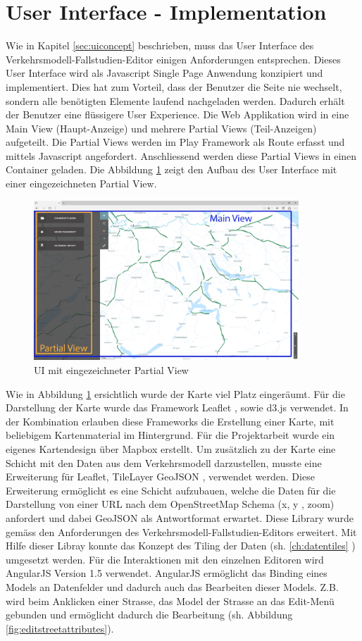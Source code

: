 \section{User Interface - Implementation}
Wie in Kapitel \ref{sec:uiconcept}  beschrieben, muss das User Interface des Verkehrsmodell-Fallstudien-Editor einigen Anforderungen entsprechen. Dieses User Interface wird als Javascript Single Page Anwendung konzipiert und implementiert. Dies hat zum Vorteil, dass der Benutzer die Seite nie wechselt, sondern alle benötigten Elemente laufend nachgeladen werden. Dadurch erhält der Benutzer eine flüssigere User Experience. Die Web Applikation wird in eine Main View (Haupt-Anzeige) und mehrere Partial Views (Teil-Anzeigen) aufgeteilt. Die Partial Views werden im Play Framework als Route erfasst und mittels Javascript angefordert. Anschliessend werden diese Partial Views in einen Container geladen. Die Abbildung \ref{fig:mainviewpartialview} zeigt den Aufbau des User Interface mit einer eingezeichneten Partial View.
\begin{figure}[H]
\centering
\includegraphics[height=6cm]{images/Mainviewpartialview.png}
\caption{UI mit eingezeichneter Partial View}
\label{fig:mainviewpartialview}
\end{figure}
\noindent
Wie in Abbildung \ref{fig:mainviewpartialview} ersichtlich wurde der Karte viel Platz eingeräumt. Für die Darstellung der Karte wurde das Framework Leaflet \cite{Leaflet}, sowie d3.js \cite{D3JS} verwendet. In der Kombination erlauben diese Frameworks die Erstellung einer Karte, mit beliebigem Kartenmaterial im Hintergrund. Für die Projektarbeit wurde ein eigenes Kartendesign über Mapbox\cite{Mapbox} erstellt. Um zusätzlich zu der Karte eine Schicht mit den Daten aus dem Verkehrsmodell darzustellen, musste eine Erweiterung für Leaflet, TileLayer GeoJSON \cite{LeafletGeoJSON},  verwendet werden. Diese Erweiterung ermöglicht es eine Schicht aufzubauen, welche die Daten für die Darstellung von einer URL nach dem OpenStreetMap Schema (x, y , zoom) anfordert und dabei GeoJSON als Antwortformat erwartet. Diese Library wurde gemäss den Anforderungen des Verkehrsmodell-Fallstudien-Editors erweitert. Mit Hilfe dieser Libray konnte das Konzept des Tiling der Daten (sh. \ref{ch:datentiles} ) umgesetzt werden. Für die Interaktionen mit den einzelnen Editoren wird AngularJS \cite{AngularJS} Version 1.5 verwendet. AngularJS ermöglicht das Binding eines Models an Datenfelder und dadurch auch das Bearbeiten dieser Models. Z.B. wird beim Anklicken einer Strasse, das Model der Strasse an das Edit-Menü gebunden und ermöglicht dadurch die Bearbeitung (sh. Abbildung \ref{fig:editstreetattributes}).
